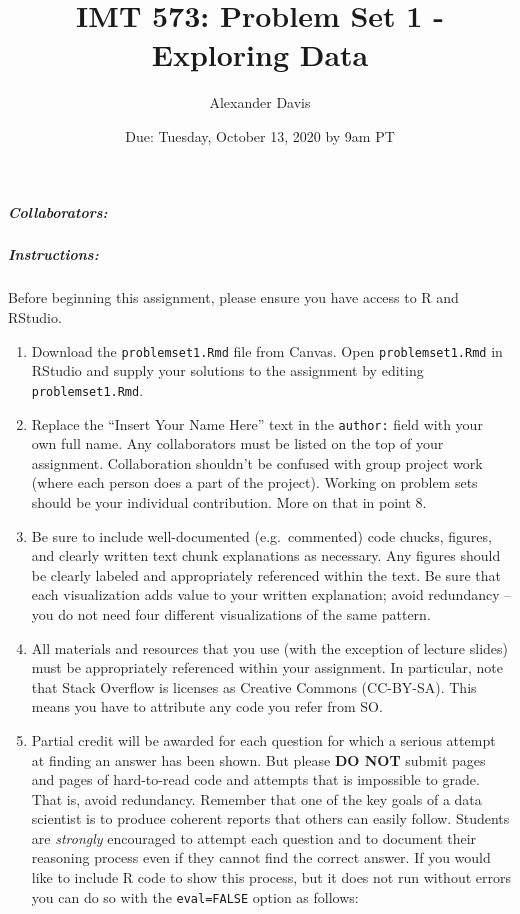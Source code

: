 \documentclass[
]{article}
\title{IMT 573: Problem Set 1 - Exploring Data}
\author{Alexander Davis}
\date{Due: Tuesday, October 13, 2020 by 9am PT}
\begin{document}
\maketitle

\hypertarget{collaborators}{%
\subparagraph{Collaborators: }\label{collaborators}}

\hypertarget{instructions}{%
\subparagraph{Instructions:}\label{instructions}}

Before beginning this assignment, please ensure you have access to R and
RStudio.

\begin{enumerate}
\def\labelenumi{\arabic{enumi}.}
\item
  Download the \texttt{problemset1.Rmd} file from Canvas. Open
  \texttt{problemset1.Rmd} in RStudio and supply your solutions to the
  assignment by editing \texttt{problemset1.Rmd}.
\item
  Replace the ``Insert Your Name Here'' text in the \texttt{author:}
  field with your own full name. Any collaborators must be listed on the
  top of your assignment. Collaboration shouldn't be confused with group
  project work (where each person does a part of the project). Working
  on problem sets should be your individual contribution. More on that
  in point 8.
\item
  Be sure to include well-documented (e.g.~commented) code chucks,
  figures, and clearly written text chunk explanations as necessary. Any
  figures should be clearly labeled and appropriately referenced within
  the text. Be sure that each visualization adds value to your written
  explanation; avoid redundancy -- you do not need four different
  visualizations of the same pattern.
\item
  All materials and resources that you use (with the exception of
  lecture slides) must be appropriately referenced within your
  assignment. In particular, note that Stack Overflow is licenses as
  Creative Commons (CC-BY-SA). This means you have to attribute any code
  you refer from SO.
\item
  Partial credit will be awarded for each question for which a serious
  attempt at finding an answer has been shown. But please \textbf{DO
  NOT} submit pages and pages of hard-to-read code and attempts that is
  impossible to grade. That is, avoid redundancy. Remember that one of
  the key goals of a data scientist is to produce coherent reports that
  others can easily follow. Students are \emph{strongly} encouraged to
  attempt each question and to document their reasoning process even if
  they cannot find the correct answer. If you would like to include R
  code to show this process, but it does not run without errors you can
  do so with the \texttt{eval=FALSE} option as follows:
\end{enumerate}
\end{document}
